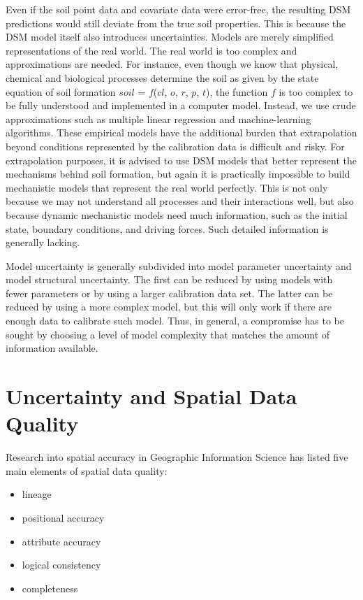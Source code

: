 \documentclass[10pt,b5paper,]{book}
\providecommand{\tightlist}{%
  \setlength{\itemsep}{0pt}\setlength{\parskip}{0pt}}
\theoremstyle{definition}
\theoremstyle{definition}
\theoremstyle{definition}
\theoremstyle{remark}
\begin{document}
Even if the soil point data and covariate data were error-free, the
resulting DSM predictions would still deviate from the true soil
properties. This is because the DSM model itself also introduces
uncertainties. Models are merely simplified representations of the real
world. The real world is too complex and approximations are needed. For
instance, even though we know that physical, chemical and biological
processes determine the soil as given by the state equation of soil
formation \(soil\) = \(f\)(\(cl\), \(o\), \(r\), \(p\), \(t\)), the
function \(f\) is too complex to be fully understood and implemented in
a computer model. Instead, we use crude approximations such as multiple
linear regression and machine-learning algorithms. These empirical
models have the additional burden that extrapolation beyond conditions
represented by the calibration data is difficult and risky. For
extrapolation purposes, it is advised to use DSM models that better
represent the mechanisms behind soil formation, but again it is
practically impossible to build mechanistic models that represent the
real world perfectly. This is not only because we may not understand all
processes and their interactions well, but also because dynamic
mechanistic models need much information, such as the initial state,
boundary conditions, and driving forces. Such detailed information is
generally lacking.

Model uncertainty is generally subdivided into model parameter
uncertainty and model structural uncertainty. The first can be reduced
by using models with fewer parameters or by using a larger calibration
data set. The latter can be reduced by using a more complex model, but
this will only work if there are enough data to calibrate such model.
Thus, in general, a compromise has to be sought by choosing a level of
model complexity that matches the amount of information available.

\hypertarget{uncertainty-and-spatial-data-quality}{%
\section{Uncertainty and Spatial Data
Quality}\label{uncertainty-and-spatial-data-quality}}

Research into spatial accuracy in Geographic Information Science has
listed five main elements of spatial data quality:

\begin{itemize}
\tightlist
\item
  lineage
\item
  positional accuracy
\item
  attribute accuracy
\item
  logical consistency
\item
  completeness
\end{itemize}
\end{document}
